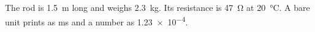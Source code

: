 \documentclass{article}
\begin{document}
The rod is \SI{1.5}{\metre} long and weighs \SI{2.3}{\kilo\gram}.
Its resistance is \SI{47}{\ohm} at \SI{20}{\degreeCelsius}.
A bare unit prints as \si{\milli\second} and a number as \num{1.23e-4}.
\end{document}
